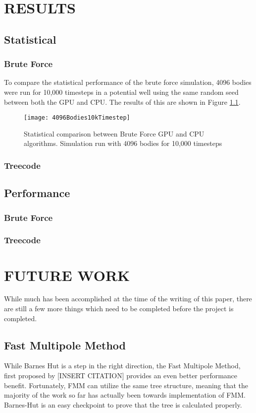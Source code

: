 \documentclass{thesis}
\begin{document}
\chapter{RESULTS}
\section{Statistical}
\subsection{Brute Force}
To compare the statistical performance of the brute force simulation, 4096 bodies were run for 10,000 timesteps in a potential well using the same random seed between both the GPU and CPU. The results of this are shown in Figure \ref{fig:BruteForceStats}. 
\begin{figure}[h]
    \caption{Statistical comparison between Brute Force GPU and CPU algorithms. Simulation run with 4096 bodies for 10,000 timesteps}
    \label{fig:BruteForceStats}
    \centering
    \texttt{[image: 4096Bodies10kTimestep]}
\end{figure}

\subsection{Treecode}
\section{Performance}
\subsection{Brute Force}
\subsection{Treecode}
\chapter{FUTURE WORK}
While much has been accomplished at the time of the writing of this paper, there are still a few more things which need to be completed before the project is completed.

\section{Fast Multipole Method}
While Barnes Hut is a step in the right direction, the Fast Multipole Method, first proposed by [INSERT CITATION] provides an even better performance benefit. Fortunately, FMM can utilize the same tree structure, meaning that the majority of the work so far has actually been towards implementation of FMM. Barnes-Hut is an easy checkpoint to prove that the tree is calculated properly.
\end{document}
